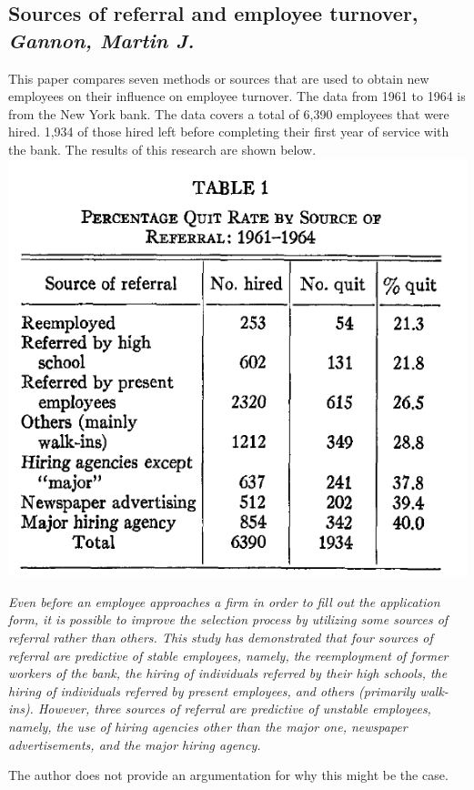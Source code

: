 \documentclass[a4paper, 11pt]{article} %
\begin{document}
\subsection*{Sources of referral and employee turnover, \emph{Gannon, Martin J.} \cite{seventh}}
This paper compares seven methods or sources that are used to obtain new employees on their influence on employee turnover. The data from 1961 to 1964 is from the New York bank. The data covers a total of 6,390 employees that were hired. 1,934 of those hired left before completing their first year of service with the bank. The results of this research are shown below.
\includegraphics[width=\textwidth]{table1}

\emph{Even before an employee approaches a firm
in order to fill out the application form, it is
possible to improve the selection process by
utilizing some sources of referral rather than
others. This study has demonstrated that four
sources of referral are predictive of stable employees,
namely, the reemployment of former
workers of the bank, the hiring of individuals
referred by their high schools, the hiring of
individuals referred by present employees, and
others (primarily walk-ins). However, three
sources of referral are predictive of unstable
employees, namely, the use of hiring agencies
other than the major one, newspaper advertisements,
and the major hiring agency.}

The author does not provide an argumentation for why this might be the case.
\end{document}
